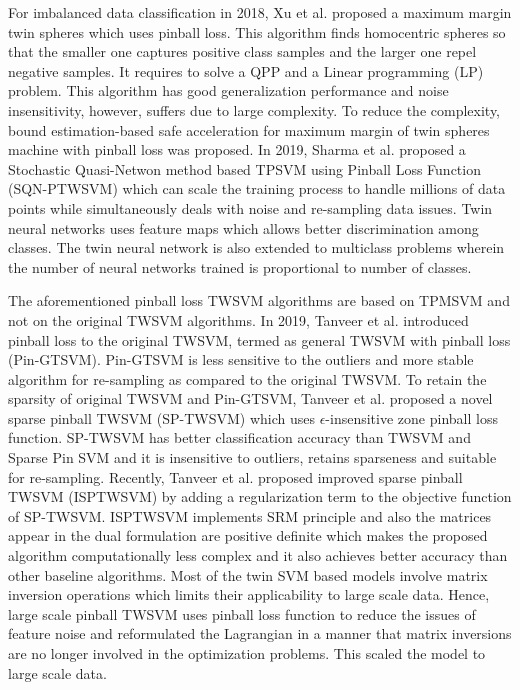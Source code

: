 \documentclass[pdflatex,sn-mathphys]{sn-jnl}%
\theoremstyle{thmstyleone}%
\theoremstyle{thmstyletwo}%
\theoremstyle{thmstylethree}%
\begin{document}
For imbalanced data classification in 2018, Xu et al. \cite{xu2018maximum} proposed a maximum margin twin spheres which uses pinball loss. This algorithm finds homocentric spheres so that the smaller one captures positive class samples and the larger one repel negative samples. It requires to solve a QPP and a Linear programming (LP) problem. This algorithm has good generalization performance and noise insensitivity,  however, suffers due to large complexity. To reduce the complexity, bound estimation-based safe acceleration for maximum margin of twin spheres machine with pinball loss \cite{yuan2021bound} was proposed. 
In 2019, Sharma et al. \cite{sharma2019large} proposed a Stochastic Quasi-Netwon method based TPSVM using Pinball Loss Function (SQN-PTWSVM) which can scale the training process to handle millions of data points while simultaneously deals with noise and re-sampling data issues. Twin neural networks \cite{pant2019twin} uses  feature maps which allows better discrimination among classes. The twin neural network is also extended to multiclass problems wherein the number of neural networks trained is proportional to number of classes.

The aforementioned pinball loss TWSVM algorithms are based on TPMSVM and not on the original TWSVM algorithms. In 2019, Tanveer et al. \cite{tanveer2019general} introduced pinball loss to the original TWSVM, termed as general TWSVM with pinball loss (Pin-GTSVM). Pin-GTSVM \cite{tanveer2019general,ganaie2021robust} is less sensitive to the outliers and more stable algorithm for re-sampling as compared to the original TWSVM. To retain the sparsity of original TWSVM and Pin-GTSVM, Tanveer et al. \cite{tanveer2019sparse} proposed a novel sparse pinball TWSVM (SP-TWSVM) which uses \(\epsilon\)-insensitive zone pinball loss function. SP-TWSVM has better classification accuracy than TWSVM and Sparse Pin SVM and it is insensitive to outliers, retains sparseness and suitable for re-sampling. Recently, Tanveer et al. \cite{tanveer2019improved} proposed improved sparse pinball TWSVM (ISPTWSVM) by adding a regularization term to the objective function of SP-TWSVM. ISPTWSVM implements SRM principle and also the matrices appear in the dual formulation are positive definite which makes the proposed algorithm computationally less complex and it also achieves better accuracy than other baseline algorithms. Most of the twin SVM based models involve matrix inversion operations which limits their applicability to large scale data. Hence, large scale pinball TWSVM \cite{tanveer2021large} uses pinball loss function to reduce the issues of feature noise and reformulated the Lagrangian in a manner that matrix inversions are no longer involved in the optimization problems. This scaled the model to large scale data. 
\end{document}

